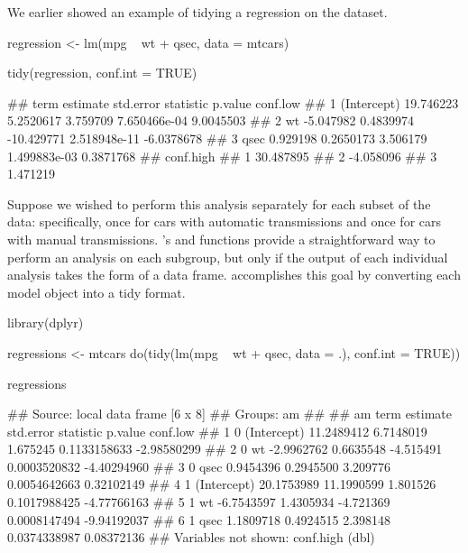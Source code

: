 We earlier showed an example of tidying a regression on the  dataset.


\begin{example}
regression <- lm(mpg ~ wt + qsec, data = mtcars)
\end{example}

\begin{example}
tidy(regression, conf.int = TRUE)
\end{example}

\begin{example}
##          term  estimate std.error  statistic      p.value   conf.low
## 1 (Intercept) 19.746223 5.2520617   3.759709 7.650466e-04  9.0045503
## 2          wt -5.047982 0.4839974 -10.429771 2.518948e-11 -6.0378678
## 3        qsec  0.929198 0.2650173   3.506179 1.499883e-03  0.3871768
##   conf.high
## 1 30.487895
## 2 -4.058096
## 3  1.471219

\end{example}


Suppose we wished to perform this analysis separately for each subset of the data: specifically, once for cars with automatic transmissions and once for cars with manual transmissions. 's  and  functions provide a straightforward way to perform an analysis on each subgroup, but only if the output of each individual analysis takes the form of a data frame.  accomplishes this goal by converting each model object into a tidy format.


\begin{example}
library(dplyr)
\end{example}

\begin{example}
regressions <- mtcars %
    do(tidy(lm(mpg ~ wt + qsec, data = .), conf.int = TRUE))
\end{example}

\begin{example}
regressions
\end{example}

\begin{example}
## Source: local data frame [6 x 8]
## Groups: am
## 
##   am        term   estimate  std.error statistic      p.value    conf.low
## 1  0 (Intercept) 11.2489412  6.7148019  1.675245 0.1133158633 -2.98580299
## 2  0          wt -2.9962762  0.6635548 -4.515491 0.0003520832 -4.40294960
## 3  0        qsec  0.9454396  0.2945500  3.209776 0.0054642663  0.32102149
## 4  1 (Intercept) 20.1753989 11.1990599  1.801526 0.1017988425 -4.77766163
## 5  1          wt -6.7543597  1.4305934 -4.721369 0.0008147494 -9.94192037
## 6  1        qsec  1.1809718  0.4924515  2.398148 0.0374338987  0.08372136
## Variables not shown: conf.high (dbl)

\end{example}


